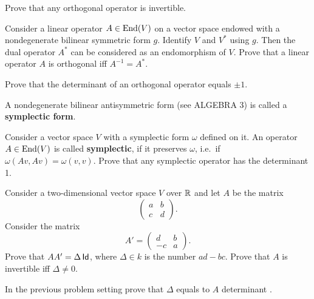 \documentclass[12pt]{article}
\begin{document}
\begin{zadacha}[!]
Prove that any orthogonal operator is invertible.
\end{zadacha}

\begin{zadacha}[!]
  Consider a linear operator $A\in \operatorname{End}(V)$ on a vector space endowed
  with a nondegenerate bilinear symmetric form $g$.  Identify $V$ and
  $V^*$ using $g$. Then the dual operator $A^*$ can be considered as an
  endomorphism of $V$. Prove that a linear operator $A$ is orthogonal
  iff $A^{-1} = A^*$.
\end{zadacha}

\begin{zadacha}[!]\label{det.orth}
  Prove that the determinant of an orthogonal operator equals $\pm 1$.
\end{zadacha}


\begin{opredelenie}
A nondegenerate bilinear antisymmetric form 
(see ALGEBRA 3) is called a {\bf symplectic form}.
\end{opredelenie}

\begin{zadacha}[*]
  Consider a vector space $V$ with a symplectic form $\omega$ defined
  on it. An operator $A\in \operatorname{End}(V)$ is called {\bf symplectic}, if it
  preserves $\omega$, i.e.\ if $\omega(Av, Av) = \omega(v,v)$.  Prove
  that any symplectic operator has the determinant 1.
\end{zadacha}

\begin{zadacha}[!]
Consider a two-dimensional vector space $V$ over ${\mathbb R}$ and let $A$ be
the matrix
$$
\begin{pmatrix}
a & b\\
c & d
\end{pmatrix}.
$$
Consider the matrix
$$
A'= \begin{pmatrix}
d & b\\
-c & a
\end{pmatrix}.
$$
Prove that $A A'= \Delta \operatorname{\sf Id}$,
where $\Delta\in k$ is the number
$ad-bc$. Prove that $A$ is invertible iff $\Delta\neq 0$.
\end{zadacha}

\begin{zadacha}[!]
In the previous problem setting prove that  $\Delta$ equals to $A$
determinant .
\end{zadacha}
\end{document}
